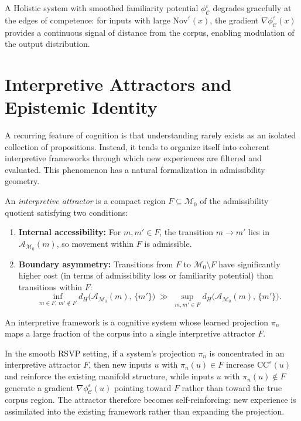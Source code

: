 \documentclass[12pt, a4paper, oneside]{book}
\newcommand{\Adm}{\mathcal{A}}
\newcommand{\M}{\mathcal{M}}
\newcommand{\C}{\mathcal{C}}
\newcommand{\proj}{\pi}
\newcommand{\dH}{d_H}
\newcommand{\Nov}{\mathrm{Nov}}
\newcommand{\CC}{\mathrm{CC}}
\newcommand{\phiCe}{\phi_{\C}^{\varepsilon}}
\begin{document}
\begin{proposition}
\label{prop:graceful}
A Holistic system with smoothed familiarity potential $\phiCe$ degrades
gracefully at the edges of competence: for inputs with large
$\Nov^\varepsilon(x)$, the gradient $\nabla \phiCe(x)$ provides a
continuous signal of distance from the corpus, enabling modulation of
the output distribution.
\end{proposition}

\section{Interpretive Attractors and Epistemic Identity}
\label{sec:interp-attractors}

A recurring feature of cognition is that understanding rarely exists as
an isolated collection of propositions. Instead, it tends to organize
itself into coherent interpretive frameworks through which new
experiences are filtered and evaluated. This phenomenon has a natural
formalization in admissibility geometry.

\begin{definition}
\label{def:interpretive-attractor}
An \emph{interpretive attractor} is a compact region $F \subseteq \M_0$
of the admissibility quotient satisfying two conditions:
\begin{enumerate}
  \item \textbf{Internal accessibility:} For $m, m' \in F$, the
    transition $m \to m'$ lies in $\Adm_{\M_0}(m)$, so movement within
    $F$ is admissible.
  \item \textbf{Boundary asymmetry:} Transitions from $F$ to
    $\M_0 \setminus F$ have significantly higher cost (in terms of
    admissibility loss or familiarity potential) than transitions
    within $F$:
    \[
      \inf_{m \in F,\, m' \notin F}
        \dH\bigl(\Adm_{\M_0}(m),\, \{m'\}\bigr)
      \;\gg\;
      \sup_{m, m' \in F}
        \dH\bigl(\Adm_{\M_0}(m),\, \{m'\}\bigr).
    \]
\end{enumerate}
An interpretive framework is a cognitive system whose learned projection
$\proj_n$ maps a large fraction of the corpus into a single interpretive
attractor $F$.
\end{definition}

\begin{proposition}
\label{prop:framework-selfreinforce}
In the smooth RSVP setting, if a system's projection $\proj_n$ is
concentrated in an interpretive attractor $F$, then new inputs $u$ with
$\proj_n(u) \in F$ increase $\CC^\varepsilon(u)$ and reinforce the
existing manifold structure, while inputs $u$ with $\proj_n(u) \notin F$
generate a gradient $\nabla \phiCe(u)$ pointing toward $F$ rather than
toward the true corpus region. The attractor therefore becomes
self-reinforcing: new experience is assimilated into the existing
framework rather than expanding the projection.
\end{proposition}
\end{document}
